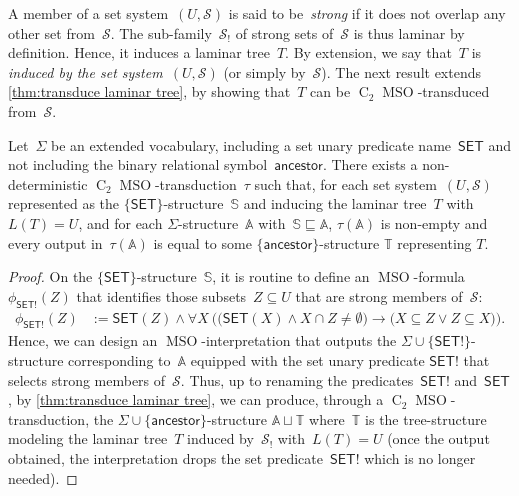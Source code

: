 \documentclass{lmcs} %
\newcommand*\defd[2][\em\color{red!25!black}]{{#1#2}}
\newcommand{\MSO}{\ensuremath{\operatorname{MSO}}\xspace}
\newcommand{\CMSO}[1][]{\ensuremath{\C[#1]{\!\!}\MSO}\xspace}
\newcommand{\C}[1][]{\ensuremath{\operatorname{C}_{#1}}\xspace}
\newcommand{\ancestor}{\mathsf{ancestor}}
\newcommand{\SET}{\ensuremath{\mathsf{SET}}\xspace}
\newcommand{\SSET}{\ensuremath{\mathsf{SET!}}\xspace}
\renewcommand{\implies}{\rightarrow}
\begin{document}
A member of a set system~$(U,\mathcal{S})$ is said to be~\defd{strong}
if it does not overlap any other set from~$\mathcal{S}$.
The sub-family~\defd{$\mathcal{S}_!$} of strong sets of~$\mathcal{S}$ is thus laminar by definition.
Hence, it induces a laminar tree~$T$.
By extension,
we say that~$T$ is \defd{induced by the set system~$(U,\mathcal{S})$} (or simply by~$\mathcal{S}$).
The next result extends \autoref{thm:transduce laminar tree},
by showing that~$T$ can be \CMSO[2]-transduced from~$\mathcal{S}$.
\begin{lem}
    \label{lem:transduce laminar tree induced by weakly-partitive family}
    Let~$\Sigma$ be an extended vocabulary,
    including a set unary predicate name~$\SET$
    and not including the binary relational symbol~$\ancestor$.
    There exists a non-deterministic \CMSO[2]-transduction~$\tau$
    such that,
    for each set system~$(U,\mathcal{S})$
    represented as the $\{\SET\}$-structure~$\mathbb{S}$
    and inducing the laminar tree~$T$ with ${L(T)=U}$,
    and for each $\Sigma$-structure~$\mathbb{A}$
    with~$\mathbb{S}\sqsubseteq\mathbb{A}$,
    $\tau(\mathbb{A})$ is non-empty
    and every output in~$\tau(\mathbb{A})$
    is equal to some $\{\ancestor\}$-structure $\mathbb{T}$ representing $T$.
\end{lem}
\begin{proof}
    On the $\{\SET\}$-structure~$\mathbb{S}$,
    it is routine to define an \MSO-formula~$\phi_{\SSET}(Z)$
    that identifies those subsets~$Z\subseteq U$
    that are strong members of~$\mathcal{S}$:
    \begin{align*}
        \phi_{\SSET}(Z)&:=
        \SET(Z)
        \land
        \forall X\:
        \Big(
        \big( \SET(X) \land X\cap Z\neq\emptyset \big)
        \implies
        \big( X\subseteq Z \lor Z\subseteq X \big)
        \Big).
    \end{align*}
    Hence, we can design an \MSO-interpretation
    that outputs the $\Sigma\cup\{\SSET\}$-structure
    corresponding to~$\mathbb{A}$ equipped with the set unary predicate $\SSET$
    that selects strong members of~$\mathcal{S}$.
    Thus, up to renaming the predicates~$\SSET$ and~$\SET$,
    by \autoref{thm:transduce laminar tree},
    we can produce,
    through a \CMSO[2]-transduction,
    the $\Sigma\cup\{\ancestor\}$-structure $\mathbb{A}\sqcup\mathbb{T}$
    where~$\mathbb{T}$ is the tree-structure modeling the laminar tree~$T$ induced by~$\mathcal{S}_!$
    with~$L(T)=U$
    (once the output obtained, the interpretation drops the set predicate~$\SSET$ which is no longer needed).
\end{proof}
\end{document}
